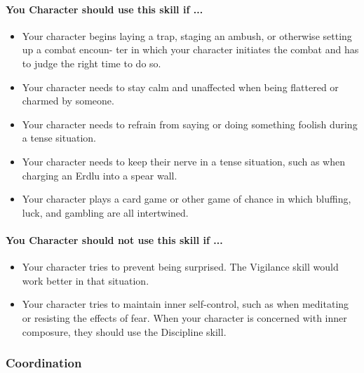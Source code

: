 \begin{multicols}{2}
\paragraph{You Character should use this skill if ...}
\begin{itemize}
    \item Your character begins laying a trap, staging an ambush, or otherwise
        setting up a combat encoun- ter in which your character initiates the
        combat and has to judge the right time to do so.
    \item Your character needs to stay calm and unaffected when being flattered
        or charmed by someone.
    \item Your character needs to refrain from saying or doing something foolish
        during a tense situation.
    \item Your character needs to keep their nerve in a tense situation, such as
        when charging an Erdlu into a spear wall.
    \item Your character plays a card game or other game of chance in which bluffing,
        luck, and gambling are all intertwined.
\end{itemize}
\paragraph{You Character should not use this skill if ...}
\begin{itemize}
    \item Your character tries to prevent being surprised. The Vigilance skill
        would work better in that situation.
    \item Your character tries to maintain inner self-control, such as when
        meditating or resisting the effects of fear. When your character is
        concerned with inner composure, they should use the Discipline skill.
\end{itemize}

\subsubsection{Coordination}\label{skill:coordination}

\end{multicols}
